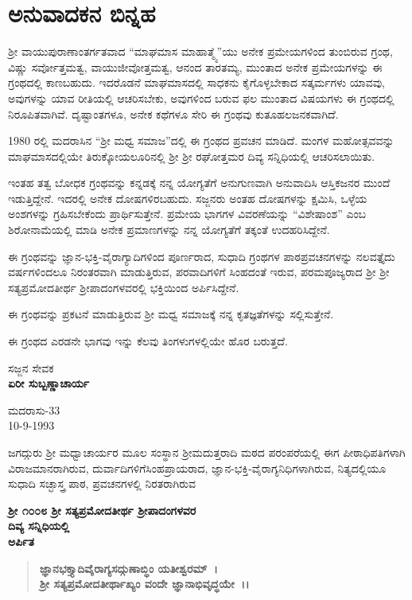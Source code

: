 
\chapter*{ಅನುವಾದಕನ ಬಿನ್ನಹ}

 ಶ‍್ರೀ ವಾಯುಪುರಾಣಾಂತರ್ಗತವಾದ “ಮಾಘಮಾಸ ಮಾಹಾತ್ಮ್ಯೆ”ಯು ಅನೇಕ ಪ್ರಮೇಯಗಳಿಂದ ತುಂಬಿರುವ ಗ್ರಂಥ, ವಿಷ್ಣು ಸರ್ವೋತ್ತಮತ್ವ, ವಾಯುಜೀವೋತ್ತಮತ್ವ, ಆನಂದ ತಾರತಮ್ಯ, ಮುಂತಾದ ಅನೇಕ ಪ್ರಮೇಯಗಳನ್ನು ಈ ಗ್ರಂಥದಲ್ಲಿ ಕಾಣಬಹುದು. ಇದರೊಡನೆ ಮಾಘಮಾಸದಲ್ಲಿ ಸಾಧಕನು ಕೈಗೊಳ್ಳಬೇಕಾದ ಸತ್ಕರ್ಮಗಳು ಯಾವವು, ಅವುಗಳನ್ನು ಯಾವ ರೀತಿಯಲ್ಲಿ ಆಚರಿಸಬೇಕು, ಅವುಗಳಿಂದ ಬರುವ ಫಲ ಮುಂತಾದ ವಿಷಯಗಳು ಈ ಗ್ರಂಥದಲ್ಲಿ ನಿರೂಪಿತವಾಗಿವೆ. ದೃಷ್ಟಾಂತಗಳೂ, ಅನೇಕ ಕಥೆಗಳೂ ಸೇರಿ ಈ ಗ್ರಂಥವು ಕುತೂಹಲಜನಕವಾಗಿದೆ.

1980 ರಲ್ಲಿ ಮದರಾಸಿನ “ಶ‍್ರೀ ಮಧ್ವ ಸಮಾಜ”ದಲ್ಲಿ ಈ ಗ್ರಂಥದ ಪ್ರವಚನ ಮಾಡಿದೆ. ಮಂಗಳ ಮಹೋತ್ಸವವನ್ನು ಮಾಘಮಾಸದಲ್ಲಿಯೇ ತಿರುಕ್ಕೋಯಲೂರಿನಲ್ಲಿ ಶ‍್ರೀ ಶ‍್ರೀ ರಘೋತ್ತಮರ ದಿವ್ಯ ಸನ್ನಿಧಿಯಲ್ಲಿ ಆಚರಿಸಲಾಯಿತು.

ಇಂತಹ ತತ್ವ ಬೋಧಕ ಗ್ರಂಥವನ್ನು ಕನ್ನಡಕ್ಕೆ ನನ್ನ ಯೋಗ್ಯತೆಗೆ ಅನುಗುಣವಾಗಿ ಅನುವಾದಿಸಿ ಆಸ್ತಿಕಜನರ ಮುಂದೆ ಇಡುತ್ತಿದ್ದೇನೆ. ಇದರಲ್ಲಿ ಅನೇಕ ದೋಷಗಳಿರಬಹುದು. ಸಜ್ಜನರು ಅಂತಹ ದೋಷಗಳನ್ನು ಕ್ಷಮಿಸಿ, ಒಳ್ಳೆಯ ಅಂಶಗಳನ್ನು ಗ್ರಹಿಸಬೇಕೆಂದು ಪ್ರಾರ್ಥಿಸು\-ತ್ತೇನೆ. ಪ್ರಮೇಯ ಭಾಗಗಳ ವಿವರಣೆಯನ್ನು “ವಿಶೇಷಾಂಶ” ಎಂಬ ಶಿರೋನಾಮೆಯಲ್ಲಿ ಮಾಡಿ ಅನೇಕ ಪ್ರಮಾಣಗಳನ್ನು ನನ್ನ ಯೋಗ್ಯತೆಗೆ ತಕ್ಕಂತೆ ಉದಹರಿಸಿದ್ದೇನೆ.

ಈ ಗ್ರಂಥವನ್ನು ಜ್ಞಾನ-ಭಕ್ತಿ-ವೈರಾಗ್ಯಾದಿಗಳಿಂದ ಪೂರ್ಣರಾದ, ಸುಧಾದಿ ಗ್ರಂಥಗಳ ಪಾಠಪ್ರವಚನಗಳನ್ನು ನಲವತ್ತೈದು ವರ್ಷಗಳಿಂದಲೂ ನಿರಂತರವಾಗಿ ಮಾಡುತ್ತಿರುವ, ಪರವಾದಿಗಳಿಗೆ ಸಿಂಹದಂತೆ ಇರುವ, ಪರಮಪೂಜ್ಯರಾದ ಶ‍್ರೀ ಶ‍್ರೀ ಸತ್ಯಪ್ರಮೋದತೀರ್ಥ ಶ‍್ರೀಪಾದಂಗಳವರಲ್ಲಿ ಭಕ್ತಿಯಿಂದ ಅರ್ಪಿಸಿದ್ದೇನೆ.

\newpage

ಈ ಗ್ರಂಥವನ್ನು ಪ್ರಕಟನೆ ಮಾಡುತ್ತಿರುವ ಶ‍್ರೀ ಮಧ್ವ ಸಮಾಜಕ್ಕೆ ನನ್ನ ಕೃತಜ್ಞತೆಗಳನ್ನು ಸಲ್ಲಿಸುತ್ತೇನೆ.

ಈ ಗ್ರಂಥದ ಎರಡನೇ ಭಾಗವು ಇನ್ನು ಕೆಲವು ತಿಂಗಳುಗಳಲ್ಲಿಯೇ ಹೊರ ಬರುತ್ತದೆ.

\begin{flushright}
ಸಜ್ಜನ ಸೇವಕ \\\textbf{ ಏರೀ ಸುಬ್ಬಣ್ಣಾಚಾರ್ಯ}
\end{flushright}

\begin{flushleft}
ಮದರಾಸು-33 \\ 10-9-1993
\end{flushleft}

\newpage

\begin{center}
\end{center}

ಜಗದ್ಗುರು ಶ‍್ರೀ ಮಧ್ವಾಚಾರ್ಯರ ಮೂಲ ಸಂಸ್ಥಾನ ಶ‍್ರೀಮದುತ್ತರಾದಿ ಮಠದ ಪರಂಪರೆಯಲ್ಲಿ ಈಗ ಪೀಠಾಧಿಪತಿಗಳಾಗಿ ವಿರಾಜಮಾನರಾಗಿರುವ, ದುರ್ವಾದಿಗಳಿಗೆ\break ಸಿಂಹಪ್ರಾಯರಾದ, ಜ್ಞಾನ-ಭಕ್ತಿ-ವೈರಾಗ್ಯನಿಧಿಗಳಾಗಿರುವ, ನಿತ್ಯದಲ್ಲಿಯೂ ಸುಧಾದಿ ಸಚ್ಛಾಸ್ತ್ರ ಪಾಠ, ಪ್ರವಚನಗಳಲ್ಲಿ ನಿರತರಾಗಿರುವ

\begin{center}
\textbf{ಶ‍್ರೀ ೧೦೦೮ ಶ‍್ರೀ ಸತ್ಯಪ್ರಮೋದತೀರ್ಥ ಶ‍್ರೀಪಾದಂಗಳವರ} \\\textbf{ದಿವ್ಯ ಸನ್ನಿಧಿಯಲ್ಲಿ} \\\textbf{ಅರ್ಪಿತ} 
\end{center}

\begin{verse}
\textbf{ಜ್ಞಾನಭಕ್ತ್ಯಾದಿವೈರಾಗ್ಯಸದ್ಗುಣಾಬ್ಧಿಂ ಯತೀಶ್ವರಮ್~।}\\\textbf{ಶ‍್ರೀ ಸತ್ಯಪ್ರಮೋದತೀರ್ಥಾಖ್ಯಂ ವಂದೇ ಜ್ಞಾನಾಭಿವೃದ್ಧಯೇ~।।}
\end{verse}

\emptypage

